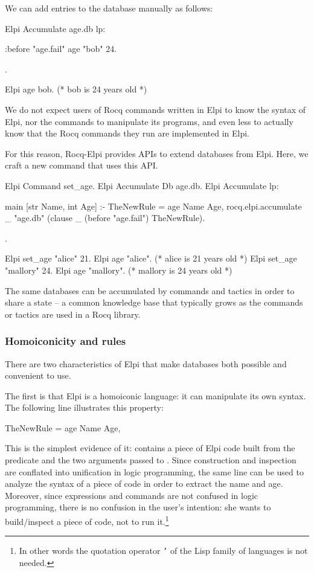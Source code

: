 \documentclass{these-ISSS}
\newenvironment{elpicode}
  {\VerbatimEnvironment\begin{elpibox}\begin{xelpicode}}{\end{xelpicode}
\end{elpibox}}
\newenvironment{rocqcode}
  {\VerbatimEnvironment\begin{rocqbox}\begin{xrocqcode}}{\end{xrocqcode}
\end{rocqbox}}
\begin{document}
We can add entries to the database manually as follows:

\begin{rocqcode}
Elpi Accumulate age.db lp:{{

  :before "age.fail"     %
  age "bob" 24.

}}.

Elpi age bob. (* bob is 24 years old *)
\end{rocqcode}


We do not expect users of Rocq commands written in Elpi to know the syntax of
Elpi, nor the commands to manipulate its programs, and even less to actually
know that the Rocq commands they run are implemented in Elpi.


For this reason, Rocq-Elpi provides APIs to extend databases from Elpi. Here,
we craft a new command  that uses this API.

\begin{rocqcode}
Elpi Command set_age.
Elpi Accumulate Db age.db.
Elpi Accumulate lp:{{

  main [str Name, int Age] :-
    TheNewRule = age Name Age,
    rocq.elpi.accumulate _ "age.db"
      (clause _ (before "age.fail") TheNewRule).

}}.

Elpi set_age "alice" 21.
Elpi age "alice". (* alice is 21 years old *)
Elpi set_age "mallory" 24.
Elpi age "mallory". (* mallory is 24 years old *)
\end{rocqcode}


The same databases can be accumulated by commands and tactics in order to
share a state -- a common knowledge base that typically grows as the commands
or tactics are used in a Rocq library.

\subsubsection{Homoiconicity and rules}


There are two characteristics of Elpi that make databases both possible and
convenient to use.


The first is that Elpi is a homoiconic language: it can manipulate its own
syntax. The following line illustrates this property:
\begin{elpicode}
TheNewRule = age Name Age,
\end{elpicode}
This is the simplest evidence of it:  contains a piece of
Elpi code built from the  predicate and the two arguments passed to
. Since construction and inspection are conflated into unification
in logic programming, the same line can be used to analyze the syntax of a
piece of code in order to extract the name and age. Moreover, since expressions
and commands are not confused in logic programming, there is no confusion
in the user's intention: she wants to build/inspect a piece of code, not to run
it.\footnote{In other words the quotation operator \texttt{'} of the Lisp family
of languages is not needed.}
\end{document}
